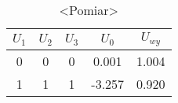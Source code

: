 \section{}

\begin{table}[H]
	\centering
	\begin{tabular}{c|c|c||c|c}
		\hline
		\(U_1\) &	\(U_2\) &	\(U_3\) &	\(U_0\) &	\(U_{wy}\) \\ \hline\hline
		0 &	0 &	0 &	 0.001 &	1.004 \\ \hline
		1 &	1 &	1 &	-3.257 &	0.920
	\end{tabular}
	\caption{<Pomiar>}
\end{table}

